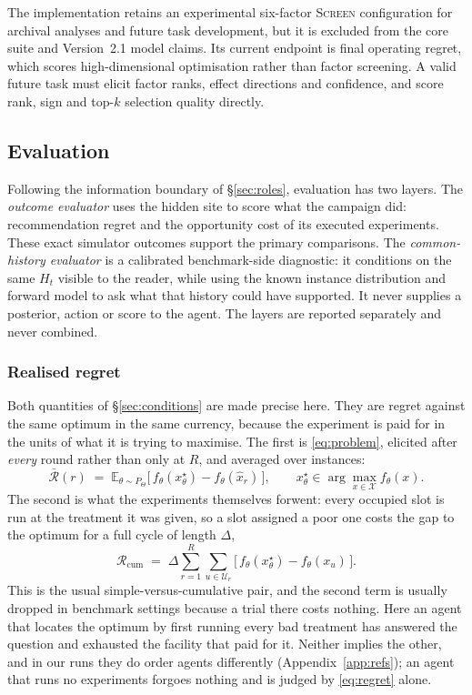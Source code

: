 The implementation retains an experimental six-factor \textsc{Screen} configuration for
archival analyses and future task development, but it is excluded from the core suite and
Version~2.1 model claims. Its current endpoint is final operating regret, which scores
high-dimensional optimisation rather than factor screening. A valid future task must elicit
factor ranks, effect directions and confidence, and score rank, sign and top-$k$ selection
quality directly.

\subsection{Evaluation}
\label{sec:eval}

Following the information boundary of \S\ref{sec:roles}, evaluation has two layers. The
\emph{outcome evaluator} uses the hidden site to score what the campaign did: recommendation
regret and the opportunity cost of its executed experiments. These exact simulator outcomes
support the primary comparisons. The \emph{common-history evaluator} is a calibrated
benchmark-side diagnostic: it conditions on the same $H_t$ visible to the reader, while
using the known instance distribution and forward model to ask what that history could have
supported. It never supplies a posterior, action or score to the agent. The layers are
reported separately and never combined.

\subsubsection{Realised regret}
\label{sec:outcome}

Both quantities of \S\ref{sec:conditions} are made precise here. They are regret against
the same optimum in the same currency, because the experiment is paid for in the units of
what it is trying to maximise. The first is \eqref{eq:problem}, elicited after
\emph{every} round rather than only at $R$, and averaged over instances:
\begin{equation}
\bar{\mathcal{R}}(r) \;=\; \mathbb{E}_{\theta \sim P_\Theta}
\Big[\, f_\theta(x^\star_\theta) - f_\theta(\hat{x}_r) \,\Big],
\qquad x^\star_\theta \in \arg\max_{x \in \mathcal{X}} f_\theta(x).
\label{eq:regret}
\end{equation}
The second is what the experiments themselves forwent: every occupied slot is run at the
treatment it was given, so a slot assigned a poor one costs the gap to the optimum for a
full cycle of length $\Delta$,
\begin{equation}
\mathcal{R}_{\mathrm{cum}} \;=\; \Delta \sum_{r=1}^{R} \sum_{u \in \mathcal{U}_r}
\Big[\, f_\theta(x^\star_\theta) - f_\theta(x_u) \,\Big].
\label{eq:cumregret}
\end{equation}
This is the usual simple-versus-cumulative pair, and the second term is usually dropped in
benchmark settings because a trial there costs nothing. Here an agent that locates the optimum
by first running every bad treatment has answered the question and exhausted the facility
that paid for it. Neither
implies the other, and in our runs they do order agents differently
(Appendix~\ref{app:refs}); an agent that runs no experiments forgoes nothing and is judged
by \eqref{eq:regret} alone.

